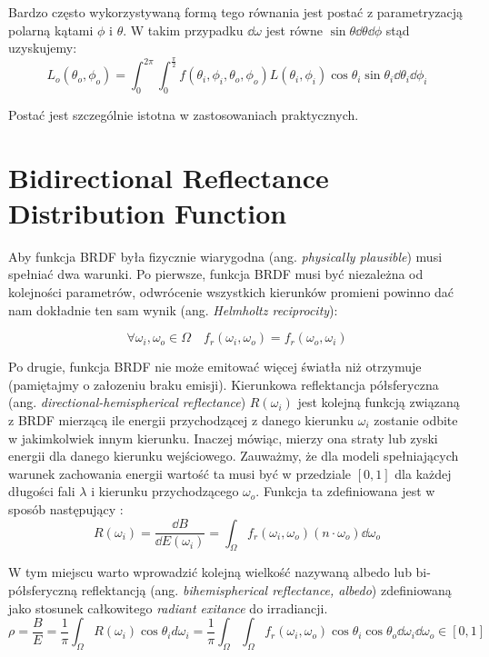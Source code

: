\documentclass[../main.tex]{subfiles}
\begin{document}
Bardzo często wykorzystywaną formą tego równania jest postać z parametryzacją polarną kątami $\phi$ i $\theta$. W takim przypadku $\dd \omega$ jest równe $\sin\theta \dd\theta \dd\phi$ \cite{wolfram_solidangle} stąd uzyskujemy:
\[
L_{o}(\theta_o, \phi_o) = \int_{0}^{2\pi} \int_{0}^{\frac{\pi}{2}} {
	f(\theta_i, \phi_i, \theta_o, \phi_o)L(\theta_i, \phi_i) \cos\theta_i \sin\theta_i
} \dd\theta_i \dd\phi_i
\]

\noindent Postać jest szczególnie istotna w zastosowaniach praktycznych.

\section{Bidirectional Reflectance Distribution Function}

Aby funkcja BRDF była fizycznie wiarygodna (ang. \textit{physically plausible})
musi spełniać dwa warunki. Po pierwsze, funkcja BRDF musi być niezależna od
kolejności parametrów, odwrócenie wszystkich kierunków promieni powinno dać nam
dokładnie ten sam wynik (ang. \textit{Helmholtz reciprocity}):

\[
  \forall{\omega_i, \omega_o \in \Omega} \quad
  f_r(\omega_i, \omega_o) = f_r(\omega_o, \omega_i)
\]

Po drugie, funkcja BRDF nie może emitować więcej światła niż otrzymuje (pamiętajmy o załozeniu braku emisji). Kierunkowa reflektancja półsferyczna (ang. \textit{directional-hemispherical reflectance}) $R(\omega_i)$ jest kolejną funkcją związaną z BRDF mierzącą ile energii przychodzącej z danego kierunku $\omega_i$ zostanie odbite w jakimkolwiek innym kierunku. Inaczej mówiąc, mierzy ona straty lub zyski energii dla danego kierunku wejściowego. Zauważmy, że dla modeli spełniających warunek zachowania energii wartość ta musi być w przedziale $\left[0,1\right]$ dla każdej długości fali $\lambda$ i kierunku przychodzącego $\omega_o$. Funkcja ta zdefiniowana jest w sposób następujący \cite{RealTimeRendering2008}:
\[
  R(\omega_i) 
  = \frac{\dd B}{\dd E(\omega_i)} 
  = \int_{\Omega} {
    f_r(\omega_i, \omega_o)
    (n \cdot \omega_o)
    \dd \omega_o
  }
\]

W tym miejscu warto wprowadzić kolejną wielkość nazywaną albedo lub bi-półsferyczną reflektancją (ang. \textit{bihemispherical reflectance, albedo}) zdefiniowaną jako stosunek całkowitego \textit{radiant exitance} do irradiancji.
\[
    \rho = \frac{B}{E} = \frac{1}{\pi} \int_{\Omega}{
        R(\omega_i) \cos\theta_i d\omega_i
    }
    = \frac{1}{\pi} \int_{\Omega} \int_{\Omega} {
        f_r(\omega_i, \omega_o) 
        \cos\theta_i 
        \cos\theta_o 
        \dd\omega_i 
        \dd\omega_o
    }
    \in \left[0, 1\right]
\]
\end{document}
